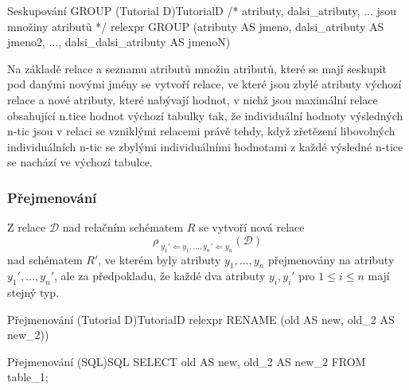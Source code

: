 \begin{upcode}{Seskupování GROUP (Tutorial D)}{}{TutorialD}
/* atributy, dalsi_atributy, ...  jsou množiny atributů */
relexpr GROUP (atributy AS jmeno, dalsi_atributy AS jmeno2, ..., dalsi_dalsi_atributy AS jmenoN)
\end{upcode}
Na základě relace a seznamu atributů množin atributů, které se mají seskupit pod danými novými jmény se vytvoří relace, ve které jsou zbylé atributy výchozí relace a nové atributy, které nabývají hodnot, v nichž jsou maximální relace obsahující n.tice hodnot výchozí tabulky tak, že individuální hodnoty výsledných n-tic jsou v relaci se vzniklými relacemi právě tehdy, když zřetězení libovolných individuálních n-tic se zbylými individuálními hodnotami z každé výsledné n-tice se nachází ve výchozí tabulce.

\subsubsection{Přejmenování}
Z relace $\mathcal{D}$ nad relačním schématem $R$ se vytvoří nová relace
$$
\rho _{ \; y_{1}' \Leftarrow y_{1}, \ldots, y_{n}' \Leftarrow y_{n}} (\mathcal{D})
$$
nad schématem $R'$, ve kterém byly atributy $y_{1}, \ldots, y_{n}$ přejmenovány na atributy $y_{1}', \ldots, y_{n}'$, ale za předpokladu, že každé dva atributy $y_{i}, y_{i}' \text{ pro } 1 \leq i \leq n$ mají stejný typ.
\begin{upcode}{Přejmenování (Tutorial D)}{}{TutorialD}
relexpr RENAME (old AS new, old_2 AS new_2))
\end{upcode}
\begin{upcode}{Přejmenování (SQL)}{}{SQL}
SELECT old AS new, old_2 AS new_2 FROM table_1;
\end{upcode}

